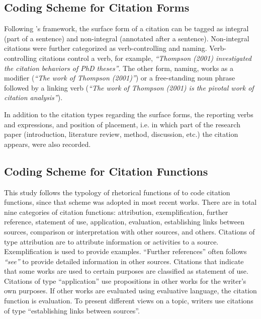 \subsection{Coding Scheme for Citation Forms}

Following \citeauthor{thompson_looking_2001}'s \citeyearpar{thompson_looking_2001} framework, the surface form of a citation can be tagged as integral (part of a sentence) and non-integral (annotated after a sentence). Non-integral citations were further categorized as verb-controlling and naming. Verb-controlling citations control a verb, for example, \textit{“Thompson (2001) investigated the citation behaviors of PhD theses”}. The other form, naming, works as a modifier (\textit{“The work of Thompson (2001)”}) or a free-standing noun phrase followed by a linking verb (\textit{“The work of Thompson (2001) is the pivotal work of citation analysis”}).

In addition to the citation types regarding the surface forms, the reporting verbs and expressions, and position of placement, i.e. in which part of the research paper (introduction, literature review, method, discussion, etc.) the citation appears, were also recorded.

\subsection{Coding Scheme for Citation Functions}
This study follows the typology of rhetorical functions of \citet{petric_rhetorical_2007} to code citation functions, since that scheme was adopted in most recent works. There are in total nine categories of citation functions: attribution, exemplification, further reference, statement of use, application, evaluation, establishing links between sources, comparison or interpretation with other sources, and others. Citations of type attribution are to attribute information or activities to a source. Exemplification is used to provide examples. “Further references” often follows \textit{“see”} to provide detailed information in other sources. Citations that indicate that some works are used to certain purposes are classified as statement of use. Citations of type “application” use propositions in other works for the writer’s own purposes. If other works are evaluated using evaluative language, the citation function is evaluation. To present different views on a topic, writers use citations of type “establishing links between sources”.